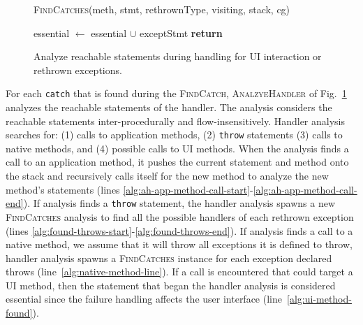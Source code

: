 \begin{figure}[t]
\begin{algorithmic}[1]
\EndFor \label{alg:calc-rethrow-types-end}

\label{alg:findcatches-rethrown-line}
\State \textsc{FindCatches}(meth, stmt, rethrownType, visiting, stack,
cg)

\label{alg:progagate-line}
\State essential $\gets$ essential $\cup$ exceptStmt
\State \textbf{return}
\EndIf
\EndFor
\label{alg:found-throws-end}
\EndIf

\EndFor

\EndProcedure
\end{algorithmic}
\caption{Analyze reachable statements during handling for UI
  interaction or rethrown exceptions.}\label{alg:analyzehandler}
\vspace{-0.1in}
\end{figure}

For each \lstinline!catch! that is found during the
\textsc{FindCatch}, \textsc{AnalzyeHandler} of
Fig.~\ref{alg:analyzehandler} analyzes the reachable statements of
the handler. The analysis considers the reachable statements
inter-procedurally and flow-insens\-itively.  Handler analysis
searches for: (1) calls to application methods, (2) \lstinline!throw!
statements (3) calls to native methods, and (4) possible calls to UI
methods. When the analysis finds a call to an application method, it
pushes the current statement and method onto the stack and recursively
calls itself for the new method to analyze the new method's statements
(lines
\ref{alg:ah-app-method-call-start}-\ref{alg:ah-app-method-call-end}).
If analysis finds a \lstinline!throw!  statement, the handler analysis
spawns a new \textsc{FindCatches} analysis to find all the possible
handlers of each rethrown exception (lines
\ref{alg:found-throws-start}-\ref{alg:found-throws-end}).  If analysis
finds a call to a native method, we assume that it will throw all
exceptions it is defined to throw, handler analysis spawns a
\textsc{FindCatches} instance for each exception declared throws
(line~\ref{alg:native-method-line}).  If a call is encountered that
could target a UI method, then the statement that began the handler
analysis is considered essential since the failure handling affects
the user interface (line~\ref{alg:ui-method-found}).



